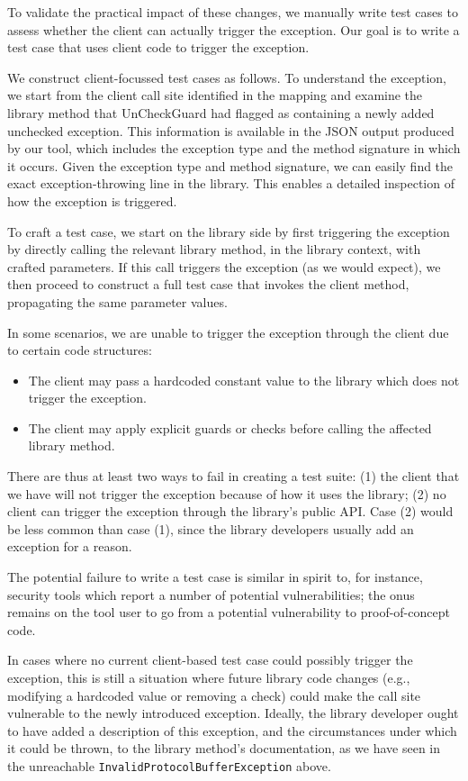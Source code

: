 To validate the practical impact of these changes, we manually write test cases to assess whether the client can actually trigger the exception. Our goal is to write a test case that uses client code to trigger the exception.

We construct client-focussed test cases as follows. To understand the exception, we start from the client call site identified in the mapping and examine the library method that UnCheckGuard had flagged as containing a newly added unchecked exception. This information is available in the JSON output produced by our tool, which includes the exception type and the method signature in which it occurs. Given the exception type and method signature, we can easily find the exact exception-throwing line in the library. This enables a detailed inspection of how the exception is triggered.

To craft a test case, we start on the library side by first triggering the exception by directly calling the relevant library method, in the library context, with crafted parameters. If this call triggers the exception (as we would expect), we then proceed to construct a full test case that invokes the client method, propagating the same parameter values.

In some scenarios, we are unable to trigger the exception through the client due to certain code structures:
\begin{itemize}
  \item The client may pass a hardcoded constant value to the library which does not trigger the exception.
  \item The client may apply explicit guards or checks before calling the affected library method.
\end{itemize}
There are thus at least two ways to fail in creating a test suite: (1) the client that we have will not trigger the exception because of how it uses the library; (2) no client can trigger the exception through the library's public API. Case (2) would be less common than case (1), since the library developers usually add an exception for a reason.

The potential failure to write a test case is similar in spirit to, for instance, security tools which report a number of potential vulnerabilities; the onus remains on the tool user to go from a potential vulnerability to proof-of-concept code.

In cases where no current client-based test case could possibly trigger the exception, this is still a situation where future library code changes (e.g., modifying a hardcoded value or removing a check) could make the call site vulnerable to the newly introduced exception. Ideally, the library developer ought to have added a description of this exception, and the circumstances under which it could be thrown, to the library method's documentation, as we have seen in the unreachable \texttt{InvalidProtocolBufferException} above.

